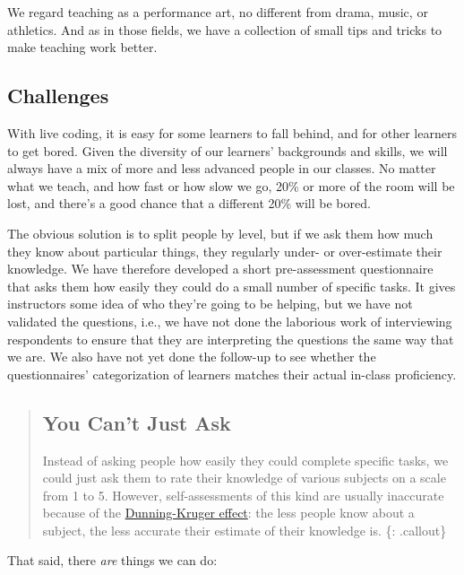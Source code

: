 
We regard teaching as a performance art, no different from drama, music,
or athletics. And as in those fields, we have a collection of small tips
and tricks to make teaching work better.

\subsection{Challenges}\label{challenges}

With live coding, it is easy for some learners to fall behind, and for
other learners to get bored. Given the diversity of our learners'
backgrounds and skills, we will always have a mix of more and less
advanced people in our classes. No matter what we teach, and how fast or
how slow we go, 20\% or more of the room will be lost, and there's a
good chance that a different 20\% will be bored.

The obvious solution is to split people by level, but if we ask them how
much they know about particular things, they regularly under- or
over-estimate their knowledge. We have therefore developed a short
pre-assessment questionnaire that asks them how easily they could do a
small number of specific tasks. It gives instructors some idea of who
they're going to be helping, but we have not validated the questions,
i.e., we have not done the laborious work of interviewing respondents to
ensure that they are interpreting the questions the same way that we
are. We also have not yet done the follow-up to see whether the
questionnaires' categorization of learners matches their actual in-class
proficiency.

\begin{quote}
\subsection{You Can't Just Ask}\label{you-cant-just-ask}

Instead of asking people how easily they could complete specific tasks,
we could just ask them to rate their knowledge of various subjects on a
scale from 1 to 5. However, self-assessments of this kind are usually
inaccurate because of the
\href{https://en.wikipedia.org/wiki/Dunning\%E2\%80\%93Kruger\_effect}{Dunning-Kruger
effect}: the less people know about a subject, the less accurate their
estimate of their knowledge is. \{: .callout\}
\end{quote}

That said, there \emph{are} things we can do:

